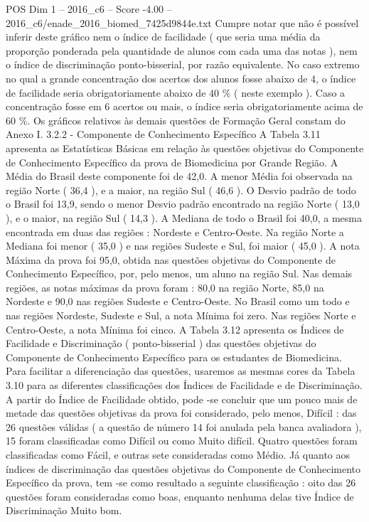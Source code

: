 \begin{textsample}{POS Dim 1 – 2016\_c6 – Score -4.00 – 2016\_c6/enade\_2016\_biomed\_7425d9844e.txt}
Cumpre notar que não é possível inferir deste gráfico nem o índice de facilidade ( que seria uma média da proporção ponderada pela quantidade de alunos com cada uma das notas ), nem o índice de discriminação ponto-bisserial, por razão equivalente.
No caso extremo no qual a grande concentração dos acertos dos alunos fosse abaixo de 4, o índice de facilidade seria obrigatoriamente abaixo de 40 \% ( neste exemplo ).
Caso a concentração fosse em 6 acertos ou mais, o índice seria obrigatoriamente acima de 60 \%.
Os gráficos relativos às demais questões de Formação Geral constam do Anexo I. 3.2.2 - Componente de Conhecimento Específico A Tabela 3.11 apresenta as Estatísticas Básicas em relação às questões objetivas do Componente de Conhecimento Específico da prova de Biomedicina por Grande Região.
A Média do Brasil deste componente foi de 42,0.
A menor Média foi observada na região Norte ( 36,4 ), e a maior, na região Sul ( 46,6 ).
O Desvio padrão de todo o Brasil foi 13,9, sendo o menor Desvio padrão encontrado na região Norte ( 13,0 ), e o maior, na região Sul ( 14,3 ).
A Mediana de todo o Brasil foi 40,0, a mesma encontrada em duas das regiões : Nordeste e Centro-Oeste.
Na região Norte a Mediana foi menor ( 35,0 ) e nas regiões Sudeste e Sul, foi maior ( 45,0 ).
A nota Máxima da prova foi 95,0, obtida nas questões objetivas do Componente de Conhecimento Específico, por, pelo menos, um aluno na região Sul.
Nas demais regiões, as notas máximas da prova foram : 80,0 na região Norte, 85,0 na Nordeste e 90,0 nas regiões Sudeste e Centro-Oeste.
No Brasil como um todo e nas regiões Nordeste, Sudeste e Sul, a nota Mínima foi zero.
Nas regiões Norte e Centro-Oeste, a nota Mínima foi cinco.
A Tabela 3.12 apresenta os Índices de Facilidade e Discriminação ( ponto-bisserial ) das questões objetivas do Componente de Conhecimento Específico para os estudantes de Biomedicina.
Para facilitar a diferenciação das questões, usaremos as mesmas cores da Tabela 3.10 para as diferentes classificações dos Índices de Facilidade e de Discriminação.
A partir do Índice de Facilidade obtido, pode -se concluir que um pouco mais de metade das questões objetivas da prova foi considerado, pelo menos, Difícil : das 26 questões válidas ( a questão de número 14 foi anulada pela banca avaliadora ), 15 foram classificadas como Difícil ou como Muito difícil.
Quatro questões foram classificadas como Fácil, e outras sete consideradas como Médio.
Já quanto aos índices de discriminação das questões objetivas do Componente de Conhecimento Específico da prova, tem -se como resultado a seguinte classificação : oito das 26 questões foram consideradas como boas, enquanto nenhuma delas tive Índice de Discriminação Muito bom.

\end{textsample}

